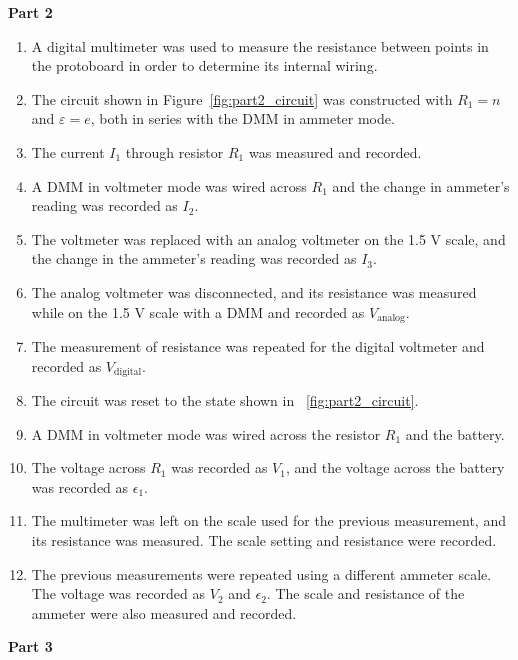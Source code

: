 \documentclass[twocolumn,english]{IEEEtran}
\theoremstyle{plain}
\theoremstyle{plain}
\begin{document}
\textbf{Part 2}
\begin{enumerate}
 \item A digital multimeter was used to measure the resistance between points in the protoboard in order to determine its internal wiring.
 \item The circuit shown in Figure~\ref{fig:part2_circuit} was constructed with $R_1=n$ and $\varepsilon = e$, both in series with the DMM in ammeter mode.
 \item The current $I_1$ through resistor $R_1$ was measured and recorded.
 \item A DMM in voltmeter mode was wired across $R_1$ and the change in ammeter's reading was recorded as $I_2$.
 \item The voltmeter was replaced with an analog voltmeter on the 1.5 V scale, and the change in the ammeter's reading was recorded as $I_3$.
 \item The analog voltmeter was disconnected, and its resistance was measured while on the 1.5 V scale with a DMM and recorded as $V_{\text{analog}}$.
 \item The measurement of resistance was repeated for the digital voltmeter and recorded as $V_{\text{digital}}$.
 \item The circuit was reset to the state shown in ~\ref{fig:part2_circuit}.
 \item A DMM in voltmeter mode was wired across the resistor $R_1$ and the battery.
 \item The voltage across $R_1$ was recorded as $V_1$, and the voltage across the battery was recorded as $\epsilon_1$.
 \item The multimeter was left on the scale used for the previous measurement, and its resistance was measured. The scale setting and resistance were recorded.
 \item The previous measurements were repeated using a different ammeter scale. The voltage was recorded as $V_2$ and $\epsilon_2$. The scale and resistance of the ammeter were also measured and recorded.
\end{enumerate}

\textbf{Part 3}
\end{document}

